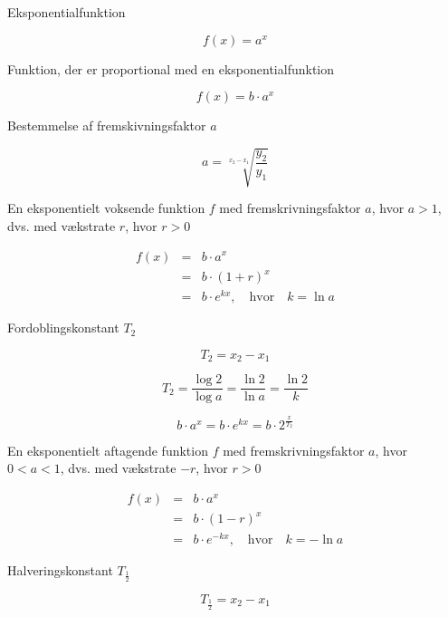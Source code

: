 \documentclass[11pt,a5paper,fleqn,leqno]{book}
\begin{document}
Eksponentialfunktion

\begin{equation}
f(x) = a^x
\end{equation}

Funktion, der er proportional med en eksponentialfunktion

\begin{equation}
f(x) = b \cdot a^x
\end{equation}

Bestemmelse af fremskivningsfaktor $a$

\begin{equation}
a = \sqrt[x_2-x_1]{\frac{y_2}{y_1}}
\end{equation}

En eksponentielt voksende funktion $f$ med fremskrivningsfaktor $a$, hvor $a > 1$, dvs. med vækstrate $r$, hvor $r > 0$

\begin{eqnarray}
f(x) & = & b \cdot a^x \\
 & = & b \cdot (1+r)^x \nonumber \\
 & = & b \cdot e^{kx}, \quad \text{hvor} \quad k = \ln a \nonumber
\end{eqnarray}

Fordoblingskonstant $T_2$

\begin{equation}
T_2 = x_2 - x_1
\end{equation}

\begin{equation}
T_2 = \frac{\log 2}{\log a} = \frac{\ln 2}{\ln a} = \frac{\ln 2}{k}
\end{equation}

\begin{equation}
b \cdot a^x = b \cdot e^{kx} = b \cdot 2^{\frac{x}{T_2}}
\end{equation}

En eksponentielt aftagende funktion $f$ med fremskrivningsfaktor $a$, hvor $0 < a < 1$, dvs. med vækstrate $-r$, hvor $r > 0$

\begin{eqnarray}
f(x) & = & b \cdot a^x \\
 & = & b \cdot (1-r)^x \nonumber \\
 & = & b \cdot e^{-kx}, \quad \text{hvor} \quad k = -\ln a \nonumber
\end{eqnarray}

Halveringskonstant $T_{\frac{1}{2}}$

\begin{equation}
T_{\frac{1}{2}} = x_2 - x_1
\end{equation}
\end{document}
